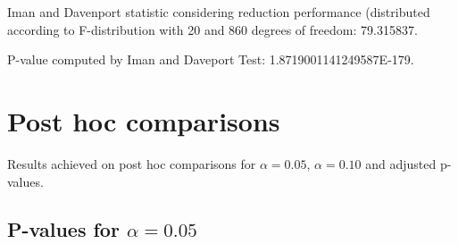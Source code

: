 \documentclass[a4paper,10pt]{article}
\begin{document}
\begin{landscape}
Iman and Davenport statistic considering reduction performance (distributed according to F-distribution with 20 and 860 degrees of freedom: 79.315837.

P-value computed by Iman and Daveport Test: 1.8719001141249587E-179.\newline



\pagebreak

\section{Post hoc comparisons}

Results achieved on post hoc comparisons for $\alpha = 0.05$, $\alpha = 0.10$ and adjusted p-values.

\subsection{P-values for $\alpha=0.05$}


\end{landscape}
\end{document}
